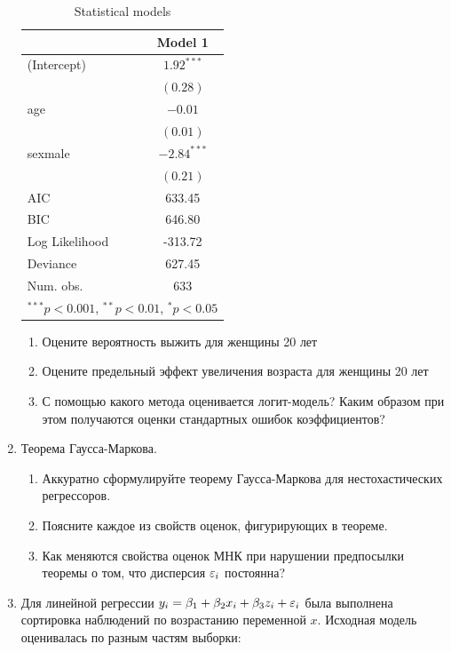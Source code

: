 \documentclass[12pt, a4paper]{article}\usepackage[]{graphicx}\usepackage[]{color}
\begin{document}
\begin{enumerate}
\begin{table}[h!]
\begin{center}
\begin{tabular}{l c }
\hline
 & Model 1 \\
\hline
(Intercept)    & $1.92^{***}$  \\
               & $(0.28)$      \\
age            & $-0.01$       \\
               & $(0.01)$      \\
sexmale        & $-2.84^{***}$ \\
               & $(0.21)$      \\
\hline
AIC            & 633.45        \\
BIC            & 646.80        \\
Log Likelihood & -313.72       \\
Deviance       & 627.45        \\
Num. obs.      & 633           \\
\hline
\multicolumn{2}{l}{\scriptsize{$^{***}p<0.001$, $^{**}p<0.01$, $^*p<0.05$}}
\end{tabular}
\caption{Statistical models}
\label{table:titanic-2}
\end{center}
\end{table}


\begin{enumerate}
\item Оцените вероятность выжить для женщины 20 лет
\item Оцените предельный эффект увеличения возраста для женщины 20 лет
\item С помощью какого метода оценивается логит-модель? Каким образом при этом получаются оценки стандартных ошибок коэффициентов?
\end{enumerate}


\item Теорема Гаусса-Маркова.

\begin{enumerate}
\item Аккуратно сформулируйте теорему Гаусса-Маркова для нестохастических регрессоров.
\item Поясните каждое из свойств оценок, фигурирующих в теореме.
\item Как меняются свойства оценок МНК при нарушении предпосылки теоремы о том, что дисперсия $\varepsilon_i$ постоянна?
\end{enumerate}

\item Для линейной регрессии $y_i = \beta_1 + \beta_2 x_i + \beta_3 z_i + \varepsilon_i$ была выполнена сортировка наблюдений по возрастанию переменной $x$. Исходная модель оценивалась по разным частям выборки:


\end{enumerate}
\end{document}
